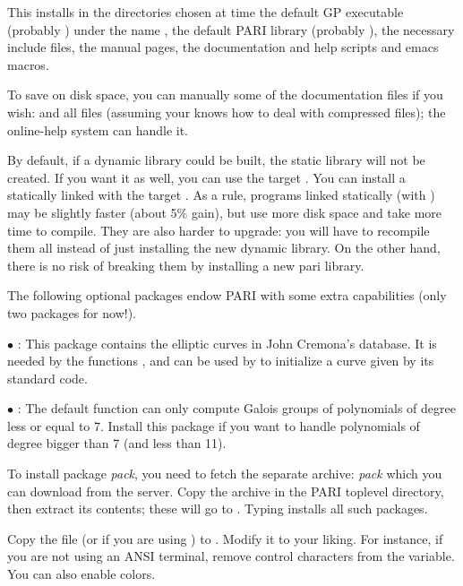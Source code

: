 This installs in the directories chosen at  time the default
GP executable (probably ) under the name , the default
PARI library (probably ), the necessary include files, the
manual pages, the documentation and help scripts and emacs macros.

To save on disk space, you can manually  some of the documentation
files if you wish:  and all  files (assuming your
 knows how to deal with compressed files); the online-help system
can handle it.

By default, if a dynamic library  could be built, the static
library  will not be created. If you want it as well, you can
use the target . You can install a statically
linked  with the target . As a rule,
programs linked statically (with ) may be slightly faster
(about 5\% gain), but use more disk space and take more time to compile.
They are also harder to upgrade: you will have to recompile them all instead
of just installing the new dynamic library. On the other hand, there is no
risk of breaking them by installing a new pari library.

 The following optional packages endow PARI with some
extra capabilities (only two packages for now!).

$\bullet$ : This package contains the elliptic curves in
John Cremona's database. It is needed by the functions ,
 and can be used by  to initialize a curve
given by its standard code.

$\bullet$ : The default  function can only
compute Galois groups of polynomials of degree less or equal to 7. Install
this package if you want to handle polynomials of degree bigger than 7 (and
less than 11). \medskip

To install package \emph{pack}, you need to fetch the separate archive:
\emph{pack} which you can download from the  server.
Copy the archive in the PARI toplevel directory, then extract its
contents; these will go to . Typing  installs all such packages.

 Copy the file  (or
 if you are using ) to . Modify
it to your liking. For instance, if you are not using an ANSI terminal,
remove control characters from the  variable. You can also
enable colors. 

